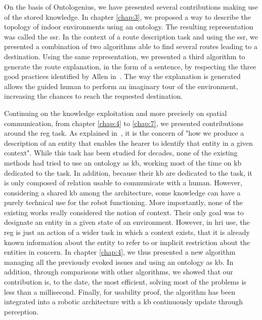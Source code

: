 On the basis of Ontologenius, we have presented several contributions making use of the stored knowledge. In chapter \ref{chap:3}, we proposed a way to describe the topology of indoor environments using an ontology. The resulting representation was called the \acrfull{ssr}. In the context of a route description task and using the \acrshort{ssr}, we presented a combination of two algorithms able to find several routes leading to a destination. Using the same representation, we presented a third algorithm to generate the route explanation, in the form of a sentence, by respecting the three good practices identified by Allen in~\cite{allen_2000_principles}. The way the explanation is generated allows the guided human to perform an imaginary tour of the environment, increasing the chances to reach the requested destination.

Continuing on the knowledge exploitation and more precisely on spatial communication, from chapter \ref{chap:4} to \ref{chap:7}, we presented contributions around the \acrfull{reg} task. As explained in~\cite{reiter_2000_building}, it is the concern of "how we produce a description of an entity that enables the hearer to identify that entity in a given context". While this task has been studied for decades, none of the existing methods had tried to use an ontology as \acrshort{kb}, working most of the time on \acrshort{kb} dedicated to the task. In addition, because their \acrshort{kb} are dedicated to the task, it is only composed of relation usable to communicate with a human. However, considering a shared \acrshort{kb} among the architecture, some knowledge can have a purely technical use for the robot functioning. More importantly, none of the existing works really considered the notion of context. Their only goal was to designate an entity in a given state of an environment. However, in \acrshort{hri} use, the \acrshort{reg} is just an action of a wider task in which a context exists, that it is already known information about the entity to refer to or implicit restriction about the entities in concern. In chapter \ref{chap:4}, we thus presented a new algorithm managing all the previously evoked issues and using an ontology as \acrshort{kb}. In addition, through comparisons with other algorithms, we showed that our contribution is, to the date, the most efficient, solving most of the problems is less than a millisecond. Finally, for usability proof, the algorithm has been integrated into a robotic architecture with a \acrshort{kb} continuously update through perception.

